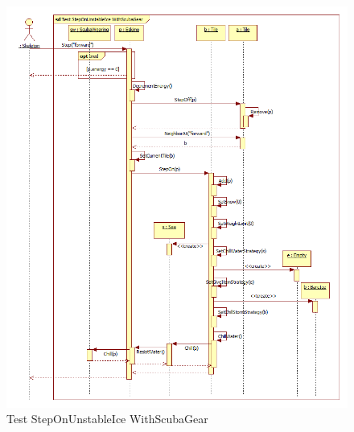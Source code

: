 \begin{figure}[h]
	\begin{center}
		\includegraphics[width=17cm]{chapters/chapter05/diagrams/Test_StepOnUnstableIce_WithScubaGear.png}
		\caption{Test StepOnUnstableIce WithScubaGear}
		\label{fig:Test StepOnUnstableIce WithScubaGear}
	\end{center}
\end{figure}

